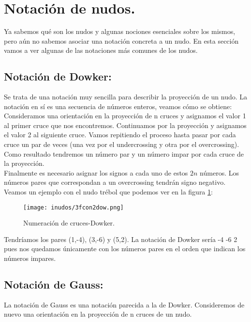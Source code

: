 \bigskip
\section{Notación de nudos.}
Ya sabemos qué son los nudos y algunas nociones esenciales sobre los mismos, pero aún no sabemos asociar una notación concreta a un nudo. En esta sección vamos a ver algunas de las notaciones más comunes de los nudos. 

\begin{center}
	\item \subsection{Notación de Dowker:}
\end{center}
Se trata de una notación muy sencilla para describir la proyección de un nudo. La notación en sí es una secuencia de números enteros, veamos cómo se obtiene:\\

Consideramos una orientación en la proyección de n cruces y asignamos el valor 1 al primer cruce que nos encontremos. Continuamos por la proyección y asignamos el valor 2 al siguiente cruce. Vamos repitiendo el proceso hasta pasar por cada cruce un par de veces (una vez por el undercrossing y otra por el overcrossing). Como resultado tendremos un número par y un número impar por cada cruce de la proyección. \\

Finalmente es necesario asignar los signos a cada uno de estos $2n$ números. Los números pares que correspondan a un overcrossing tendrán signo negativo. Veamos un ejemplo con el nudo trébol que podemos ver en la figura \ref{dow1}:\\
   \begin{figure}[h!]
   	\centering
   	\texttt{[image: inudos/3fcon2dow.png]}
   	\caption{Numeración de cruces-Dowker.}
   	\label{dow1} 
   \end{figure}
   
  Tendríamos los pares (1,-4), (3,-6) y (5,2). La notación de Dowker sería -4 -6 2 pues nos quedamos únicamente con los números pares en el orden que indican los números impares.\\

\begin{center}
	\item \subsection{Notación de Gauss:}
\end{center}
La notación de Gauss es una notación parecida a la de Dowker. Consideremos de nuevo una orientación en la proyección de n cruces de un nudo.\\

